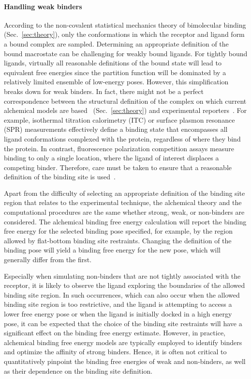 \documentclass[9pt,bestpractices]{livecoms}
\begin{document}
\paragraph{Handling weak binders}\label{sec:weak-binders}
According to the non-covalent statistical mechanics theory of bimolecular binding (Sec.~\ref{sec:theory}), only the conformations in which the receptor and ligand form a bound complex are sampled. Determining an appropriate definition of the bound macrostate can be challenging for weakly bound ligands. For tightly bound ligands, virtually all reasonable definitions of the bound state will lead to equivalent free energies since the partition function will be dominated by a relatively limited ensemble of low-energy poses. However, this simplification breaks down for weak binders.  In fact, there might not be a perfect correspondence between the structural definition of the complex on which current alchemical models are based~\cite{gilson1997statisticalthermodynamic} (Sec.~\ref{sec:theory}) and experimental reporters~\cite{mihailescu2004theory}. For example, isothermal titration calorimetry (ITC) or surface plasmon resonance (SPR) measurements effectively define a binding state that encompasses all ligand conformations complexed with the protein, regardless of where they bind the protein. In contrast, fluorescence polarization competition assays measure binding to only a single location, where the ligand of interest displaces a competing binder. Therefore, care must be taken to ensure that a reasonable definition of the binding site is used~\cite{wang2013identifying}.

Apart from the difficulty of selecting an appropriate definition of the binding site region that relates to the experimental technique, the alchemical theory and the computational procedures are the same whether strong, weak, or non-binders are considered. The alchemical binding free energy calculation will report the binding free energy for the selected binding pose specified, for example, by the region allowed by flat-bottom binding site restraints. Changing the definition of the binding pose will yield a binding free energy for the new pose, which will generally differ from the first. 

Especially when simulating non-binders that are not tightly associated with the receptor, it is likely to observe the ligand exploring the boundaries of the allowed binding site region. In such occurrences, which can also occur when the allowed binding site region is too restrictive, and the ligand is attempting to access a lower free energy pose or when the ligand is initially docked in a high energy pose, it can be expected that the choice of the binding site restraints will have a significant effect on the binding free energy estimate. However, in practice, alchemical binding free energy models are typically employed to identify binders and optimize the affinity of strong binders. Hence, it is often not critical to quantitatively pinpoint the binding free energies of weak and non-binders, as well as their dependence on the binding site definition.
\end{document}
